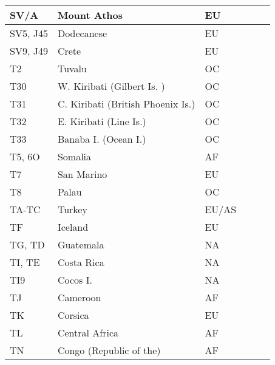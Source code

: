 \documentclass[a4paper]{article}
\begin{document}
\begin{longtable}{|p{1.5cm}|p{4cm}|l|p{2cm}|p{2cm}|p{2cm}|}
\hline
SV/A                   & Mount Athos                                & EU    & & & \\
\hline
SV5, J45               & Dodecanese                                 & EU    & & & \\
\hline
SV9, J49               & Crete                                      & EU    & & & \\
\hline
T2                     & Tuvalu                                     & OC    & & & \\
\hline
T30                    & W. Kiribati (Gilbert Is. )                 & OC    & & & \\
\hline
T31                    & C. Kiribati (British Phoenix Is.)          & OC    & & & \\
\hline
T32                    & E. Kiribati (Line Is.)                     & OC    & & & \\
\hline
T33                    & Banaba I. (Ocean I.)                       & OC    & & & \\
\hline
T5, 6O                 & Somalia                                    & AF    & & & \\
\hline
T7                     & San Marino                                 & EU    & & & \\
\hline
T8                     & Palau                                      & OC    & & & \\
\hline
TA-TC                  & Turkey                                     & EU/AS & & & \\
\hline
TF                     & Iceland                                    & EU    & & & \\
\hline
TG, TD                 & Guatemala                                  & NA    & & & \\
\hline
TI, TE                 & Costa Rica                                 & NA    & & & \\
\hline
TI9                    & Cocos I.                                   & NA    & & & \\
\hline
TJ                     & Cameroon                                   & AF    & & & \\
\hline
TK                     & Corsica                                    & EU    & & & \\
\hline
TL                     & Central Africa                             & AF    & & & \\
\hline
TN                     & Congo (Republic of the)                    & AF    & & & \\

\end{longtable}
\end{document}

